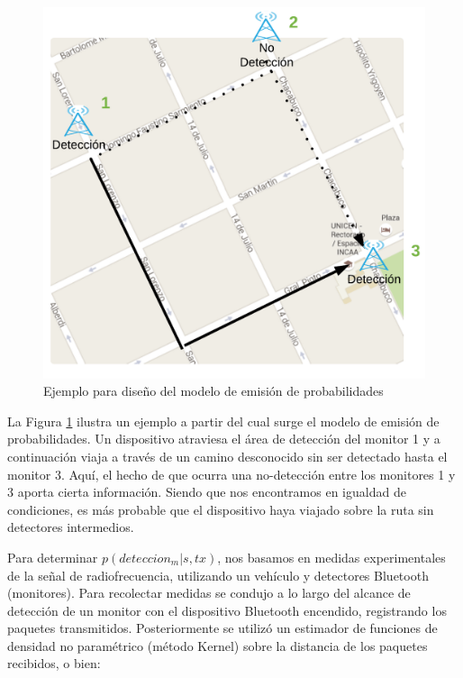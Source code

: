 \begin{figure}[!htp]
	\centering
	\includegraphics[scale=0.7]{images/motivating_example.png}
	\captionsetup{width=.7\linewidth}
	\caption{Ejemplo para diseño del modelo de emisión de probabilidades}
    \label{fig:motivating-example}
\end{figure}

La Figura \ref{fig:motivating-example} ilustra un ejemplo a partir del cual surge el modelo de emisión de probabilidades. Un dispositivo atraviesa el área de detección del monitor 1 y a continuación viaja a través de un camino desconocido sin ser detectado hasta el monitor 3. Aquí, el hecho de que ocurra una no-detección entre los monitores 1 y 3 aporta cierta información. Siendo que nos encontramos en igualdad de condiciones, es más probable que el dispositivo haya viajado sobre la ruta sin detectores intermedios.

Para determinar $p(deteccion_m|s,tx)$, nos basamos en medidas experimentales de la señal de radiofrecuencia, utilizando un vehículo y detectores Bluetooth (monitores). Para recolectar medidas se condujo a lo largo del alcance de detección de un monitor con el dispositivo Bluetooth encendido, registrando los paquetes transmitidos. Posteriormente se utilizó un estimador de funciones de densidad no paramétrico (método Kernel) sobre la distancia de los paquetes recibidos, o bien:


